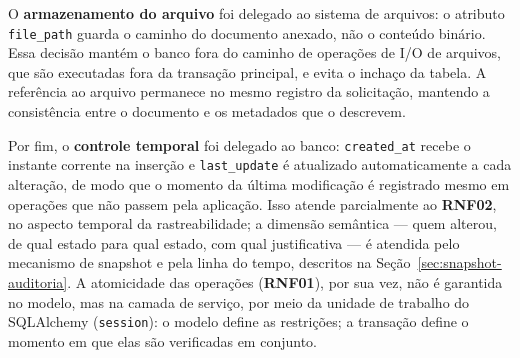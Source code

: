 O \textbf{armazenamento do arquivo} foi delegado ao sistema de arquivos: 
o atributo \texttt{file\_path} guarda o caminho do documento anexado, não 
o conteúdo binário. Essa decisão mantém o banco fora do caminho de 
operações de I/O de arquivos, que são executadas fora da transação 
principal, e evita o inchaço da tabela. A referência ao arquivo permanece 
no mesmo registro da solicitação, mantendo a consistência entre o 
documento e os metadados que o descrevem.

Por fim, o \textbf{controle temporal} foi delegado ao banco: 
\texttt{created\_at} recebe o instante corrente na inserção e 
\texttt{last\_update} é atualizado automaticamente a cada alteração, de 
modo que o momento da última modificação é registrado mesmo em operações 
que não passem pela aplicação. Isso atende parcialmente ao \textbf{RNF02}, no
aspecto temporal da rastreabilidade; a dimensão semântica — quem alterou, 
de qual estado para qual estado, com qual justificativa — é atendida pelo 
mecanismo de snapshot e pela linha do tempo, descritos na 
Seção~\ref{sec:snapshot-auditoria}. A atomicidade das operações (\textbf{RNF01}),
por sua vez, não é garantida no modelo, mas na camada de serviço, por 
meio da unidade de trabalho do SQLAlchemy (\texttt{session}): o modelo 
define as restrições; a transação define o momento em que elas são 
verificadas em conjunto.
